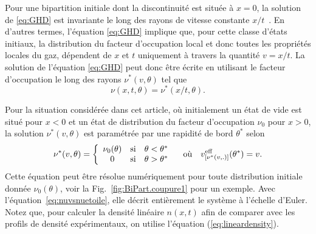 Pour une bipartition initiale dont la discontinuité est située à $x=0$, la solution de \eqref{eq:GHD} est invariante le long des rayons de vitesse constante $x/t$~\cite{bertini_transport_2016,castro-alvaredo_emergent_2016}. En d'autres termes, l'équation \eqref{eq:GHD} implique que, pour cette classe d'états initiaux, la distribution du facteur d'occupation local et donc toutes les propriétés locales du gaz, dépendent de $x$ et $t$ uniquement à travers la quantité $v=x/t$. La solution de l'équation \eqref{eq:GHD} peut donc être écrite en utilisant le facteur d'occupation le long des rayons $\nu^*(v,\theta)$ tel que
\begin{equation}
	\label{eq:nuvsnuetoile}
    \nu(x,t,\theta) = \nu^*( x/t,\theta).
\end{equation}

Pour la situation considérée dans cet article, où initialement un état de vide est situé pour $x < 0$ et un état de distribution du facteur d'occupation $\nu_0$ pour $x > 0$, la solution $\nu^*(v,\theta)$ est paramétrée par une rapidité de bord $\theta^*$ selon~\cite{bertini_transport_2016,castro-alvaredo_emergent_2016}
\begin{equation}
	\label{eq:nuetoile}
    \nu^*(v,\theta) = \left\{
    	\begin{array}{ccc}
    		\nu_0(\theta) & \text{si} & \theta < \theta^* \\
    		0 & \text{si} & \theta > \theta^* \\
   		\end{array}
    	\right. \quad \text{où} \quad  v^{\rm{eff}}_{[\nu^*(v,.)]}(\theta^*) = v.
\end{equation}
Cette équation peut être résolue numériquement pour toute distribution initiale donnée $\nu_0(\theta)$, voir la Fig.~\ref{fig:BiPart.coupure1} pour un exemple. Avec l'équation~\eqref{eq:nuvsnuetoile}, elle décrit entièrement le système à l'échelle d'Euler. Notez que, pour calculer la densité linéaire $n(x,t)$ afin de comparer avec les profils de densité expérimentaux, on utilise l'équation (\ref{eq:lineardensity}).


